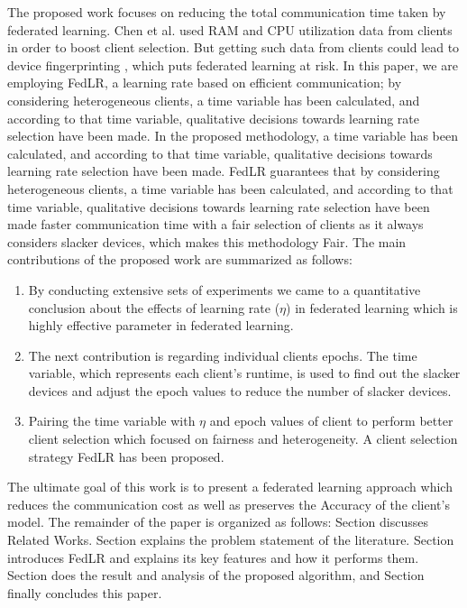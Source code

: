 \documentclass[conference]{IEEEtran}
\newcommand{\RNum}[1]{\uppercase\expandafter{\romannumeral #1\relax}}
\begin{document}
 The proposed work focuses on reducing the total communication time taken by federated learning. Chen et al. \cite{chen2023boosting} used RAM and CPU utilization data from clients in order to boost client selection. But getting such data from clients could lead to device fingerprinting \cite{radhakrishnan2014gtid} \cite{patwari2022dnn}, which puts federated learning at risk.  In this paper, we are employing FedLR, a learning rate based on efficient communication; by considering heterogeneous clients, a time variable has been calculated, and according to that time variable, qualitative decisions towards learning rate selection have been made. In the proposed methodology, a time variable has been calculated, and according to that time variable, qualitative decisions towards learning rate selection have been made.
FedLR guarantees that by considering heterogeneous clients, a time variable has been calculated, and according to that time variable, qualitative decisions towards learning rate selection have been made faster communication time with a fair selection of clients as it always considers slacker devices, which makes this methodology Fair. The main contributions of the proposed work are summarized as follows:
\begin{enumerate}
	\item By conducting extensive sets of experiments we came to a quantitative conclusion about the effects of learning rate ($\eta$) in federated learning which is highly effective parameter in federated learning.
	\item The next contribution is regarding individual clients epochs. The time variable, which represents each client's runtime, is used to find out the slacker devices and adjust the epoch values to reduce the number of slacker devices.
	\item Pairing the time variable with $\eta$ and epoch values of client to perform better client selection which focused on fairness and heterogeneity. A client selection strategy FedLR has been proposed.
\end{enumerate}

The ultimate goal of this work is to present a federated learning approach which reduces the communication cost as well as preserves the Accuracy of the client's model. The remainder of the paper is organized as follows: Section \RNum{2} discusses Related Works. Section \RNum{3} explains the problem statement of the literature. Section \RNum{4} introduces FedLR and explains its key features and how it performs them. Section \RNum{5} does the result and analysis of the proposed algorithm, and Section \RNum{6} finally concludes this paper.
\end{document}
